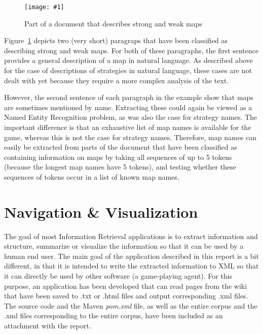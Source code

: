 \documentclass[]{article}
\newcommand{\insertfigureoriginalheight}[3]{ 
	\begin{figure}[#3]
	\begin{center}
	\texttt{[image: \#1]}
	\caption{#2}
	\label{#1}
	\end{center}
	\end{figure}
}
\newcommand{\reffigure}[1]{Figure~\ref{#1}}
\begin{document}
\insertfigureoriginalheight{ExampleMaps}{Part of a document that describes strong and weak maps}{h}

\reffigure{ExampleMaps} depicts two (very short) paragraps that have been classified as describing strong and weak maps. For both of these paragraphs, the first sentence provides a general description of a map in natural language. As described above for the case of descriptions of strategies in natural language, these cases are not dealt with yet because they require a more complex analysis of the text. 

However, the second sentence of each paragraph in the example show that maps are sometimes mentioned by name. Extracting these could again be viewed as a Named Entity Recognition problem, as was also the case for strategy names. The important difference is that an exhaustive list of map names is available for the game, whereas this is not the case for strategy names. Therefore, map names can easily be extracted from parts of the document that have been classified as containing information on maps by taking all sequences of up to 5 tokens (because the longest map names have 5 tokens), and testing whether these sequences of tokens occur in a list of known map names.

\section{Navigation \& Visualization} \label{SecNavigationVisualization}
The goal of most Information Retrieval applications is to extract information and structure, summarize or visualize the information so that it can be used by a human end user. The main goal of the application described in this report is a bit different, in that it is intended to write the extracted information to XML so that it can directly be used by other software (a game-playing agent). For this purpose, an application has been developed that can read pages from the wiki that have been saved to .txt or .html files and output corresponding .xml files. The source code and the Maven \emph{pom.xml} file, as well as the entire corpus and the .xml files corresponding to the entire corpus, have been included as an attachment with the report.
\end{document}
